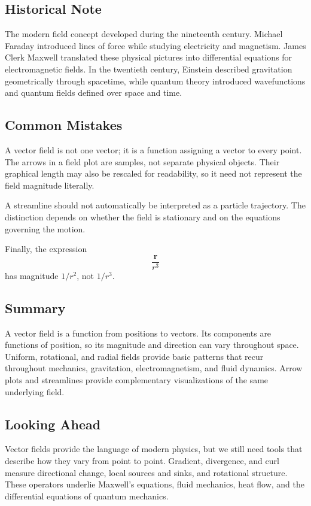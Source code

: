 \subsection{Historical Note}

The modern field concept developed during the nineteenth century. Michael
Faraday introduced lines of force while studying electricity and magnetism.
James Clerk Maxwell translated these physical pictures into differential
equations for electromagnetic fields. In the twentieth century, Einstein
described gravitation geometrically through spacetime, while quantum theory
introduced wavefunctions and quantum fields defined over space and time.

\subsection{Common Mistakes}

A vector field is not one vector; it is a function assigning a vector to every
point. The arrows in a field plot are samples, not separate physical objects.
Their graphical length may also be rescaled for readability, so it need not
represent the field magnitude literally.

A streamline should not automatically be interpreted as a particle trajectory.
The distinction depends on whether the field is stationary and on the equations
governing the motion.

Finally, the expression
\[
\frac{\mathbf r}{r^3}
\]
has magnitude $1/r^2$, not $1/r^3$.

\subsection{Summary}

A vector field is a function from positions to vectors. Its components are
functions of position, so its magnitude and direction can vary throughout
space. Uniform, rotational, and radial fields provide basic patterns that recur
throughout mechanics, gravitation, electromagnetism, and fluid dynamics.
Arrow plots and streamlines provide complementary visualizations of the same
underlying field.

\subsection*{Looking Ahead}

Vector fields provide the language of modern physics, but we still need tools
that describe how they vary from point to point. Gradient, divergence, and curl
measure directional change, local sources and sinks, and rotational structure.
These operators underlie Maxwell's equations, fluid mechanics, heat flow, and
the differential equations of quantum mechanics.

